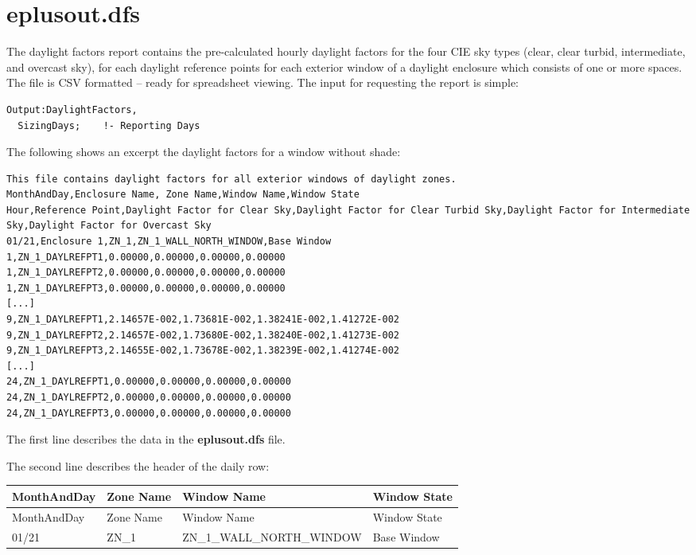 \section{eplusout.dfs}\label{eplusout.dfs}

The daylight factors report contains the pre-calculated hourly daylight factors for the four CIE sky types (clear, clear turbid, intermediate, and overcast sky), for each daylight reference points for each exterior window of a daylight enclosure which consists of one or more spaces. The file is CSV formatted -- ready for spreadsheet viewing. The input for requesting the report is simple:

\begin{lstlisting}
Output:DaylightFactors,
  SizingDays;    !- Reporting Days
\end{lstlisting}

The following shows an excerpt the daylight factors for a window without shade:

\begin{lstlisting}
This file contains daylight factors for all exterior windows of daylight zones.
MonthAndDay,Enclosure Name, Zone Name,Window Name,Window State
Hour,Reference Point,Daylight Factor for Clear Sky,Daylight Factor for Clear Turbid Sky,Daylight Factor for Intermediate Sky,Daylight Factor for Overcast Sky
01/21,Enclosure 1,ZN_1,ZN_1_WALL_NORTH_WINDOW,Base Window
1,ZN_1_DAYLREFPT1,0.00000,0.00000,0.00000,0.00000
1,ZN_1_DAYLREFPT2,0.00000,0.00000,0.00000,0.00000
1,ZN_1_DAYLREFPT3,0.00000,0.00000,0.00000,0.00000
[...]
9,ZN_1_DAYLREFPT1,2.14657E-002,1.73681E-002,1.38241E-002,1.41272E-002
9,ZN_1_DAYLREFPT2,2.14657E-002,1.73680E-002,1.38240E-002,1.41273E-002
9,ZN_1_DAYLREFPT3,2.14655E-002,1.73678E-002,1.38239E-002,1.41274E-002
[...]
24,ZN_1_DAYLREFPT1,0.00000,0.00000,0.00000,0.00000
24,ZN_1_DAYLREFPT2,0.00000,0.00000,0.00000,0.00000
24,ZN_1_DAYLREFPT3,0.00000,0.00000,0.00000,0.00000
\end{lstlisting}

The first line describes the data in the \textbf{eplusout.dfs} file.

The second line describes the header of the daily row:

{\scriptsize
\begin{longtable}[c]{>{\raggedright}p{1.0in}>{\raggedright}p{1.0in}>{\raggedright}p{2.5in}>{\raggedright}p{1.5in}}
\toprule
MonthAndDay & Zone Name & Window Name & Window State \tabularnewline
\midrule
\endfirsthead

\toprule
MonthAndDay & Zone Name & Window Name & Window State \tabularnewline
\midrule
\endhead

01/21 & ZN\_1 & ZN\_1\_WALL\_NORTH\_WINDOW & Base Window \tabularnewline
\bottomrule
\end{longtable}}

